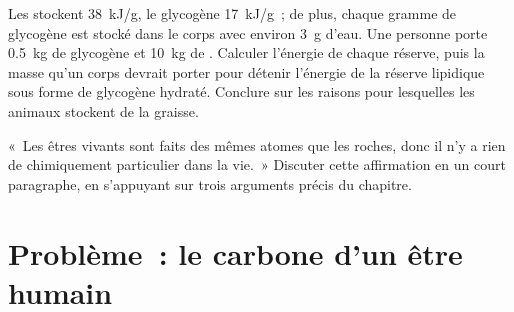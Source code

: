 \begin{exercise}[$\star\star\star$]\label{exo:g10:chemistry-of-life:14}
Les  stockent \qty{38}{kJ/g}, le glycogène \qty{17}{kJ/g}~; de
plus, chaque gramme de glycogène est stocké dans le corps avec environ
\qty{3}{g} d'eau. Une personne porte \qty{0.5}{kg} de glycogène et
\qty{10}{kg} de . Calculer l'énergie de chaque réserve, puis la
masse qu'un corps devrait porter pour détenir l'énergie de la réserve
lipidique sous forme de glycogène hydraté. Conclure sur les raisons
pour lesquelles les animaux stockent de la graisse.
\end{exercise}

\begin{exercise}[$\star\star\star$]\label{exo:g10:chemistry-of-life:15}
«~Les êtres vivants sont faits des mêmes atomes que les roches, donc il
n'y a rien de chimiquement particulier dans la vie.~» Discuter cette
affirmation en un court paragraphe, en s'appuyant sur trois arguments
précis du chapitre.
\end{exercise}

\section{Problème~: le carbone d'un être humain}

